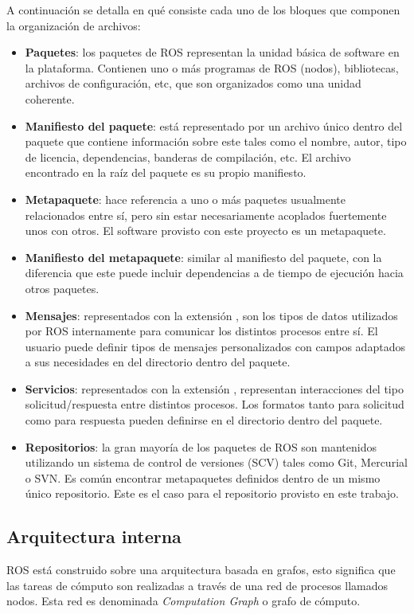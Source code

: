 \newpage
A continuación se detalla en qué consiste cada uno de los bloques que componen la organización de archivos:
\begin{itemize}
    \item \textbf{Paquetes}: los paquetes de ROS representan la unidad básica de software en la plataforma. Contienen uno o más programas de ROS (nodos), bibliotecas, archivos de configuración, etc, que son organizados como una unidad coherente.
    \item \textbf{Manifiesto del paquete}: está representado por un archivo único dentro del paquete que contiene información sobre este tales como el nombre, autor, tipo de licencia, dependencias, banderas de compilación, etc. El archivo  encontrado en la raíz del paquete es su propio manifiesto.
    \item \textbf{Metapaquete}: hace referencia a uno o más paquetes usualmente relacionados entre sí, pero sin estar necesariamente acoplados fuertemente unos con otros. El software provisto con este proyecto es un metapaquete.
    \item \textbf{Manifiesto del metapaquete}: similar al manifiesto del paquete, con la diferencia que este puede incluir dependencias a de tiempo de ejecución hacia otros paquetes.
    \item \textbf{Mensajes}: representados con la extensión , son los tipos de datos utilizados por ROS internamente para comunicar los distintos procesos entre sí. El usuario puede definir tipos de mensajes personalizados con campos adaptados a sus necesidades en del directorio  dentro del paquete.
    \item  \textbf{Servicios}: representados con la extensión , representan interacciones del tipo solicitud/respuesta entre distintos procesos. Los formatos tanto para solicitud como para respuesta pueden definirse en el directorio  dentro del paquete.
    \item \textbf{Repositorios}: la gran mayoría de los paquetes de ROS son mantenidos utilizando un sistema de control de versiones (SCV) tales como Git, Mercurial o SVN. Es común encontrar metapaquetes definidos dentro de un mismo único repositorio. Este es el caso para el repositorio provisto en este trabajo.
\end{itemize}

\subsection{Arquitectura interna}
ROS está construido sobre una arquitectura basada en grafos, esto significa que las tareas de cómputo son realizadas a través de una red de procesos llamados nodos. Esta red es denominada \textit{Computation Graph} o grafo de cómputo.


